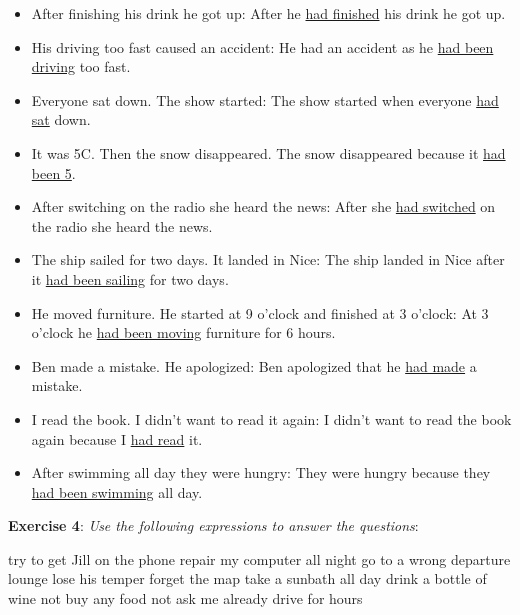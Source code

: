 \begin{itemize}

\item After finishing his drink he got up: After he \underline{had finished} his drink he got up.
\item His driving too fast caused an accident: He had an accident as he \underline{had been driving} too fast.
\item Everyone sat down. The show started: The show started when everyone \underline{had sat} down.
\item It was 5C. Then the snow disappeared. The snow disappeared because it \underline{had been 5}.
\item After switching on the radio she heard the news: After she \underline{had switched} on the radio she heard the news.
\item The ship sailed for two days. It landed in Nice: The ship landed in Nice after it \underline{had been sailing} for two days.
\item He moved furniture. He started at 9 o'clock and finished at 3 o'clock: At 3 o'clock he \underline{had been moving} furniture for 6 hours.
\item Ben made a mistake. He apologized: Ben apologized that he \underline{had made} a mistake.
\item I read the book. I didn't want to read it again: I didn't want to read the book again because I \underline{had read} it.
\item After swimming all day they were hungry: \newline They were hungry because they \underline{had been swimming} all day.

\end{itemize}

\textbf{Exercise 4}: \textit{Use the following expressions to answer the questions}:


try to get Jill on the phone   
repair my computer all night
go to a wrong departure lounge
lose his temper 
forget the map
take a sunbath all day
drink a bottle of wine
not buy any food
not ask me
already drive for hours

